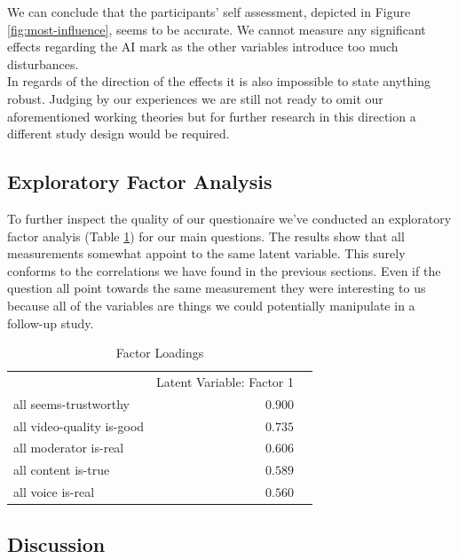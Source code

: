 \documentclass[
  a4paper,  %
  twoside,  %
  bibliography=totoc,
  headsepline,
  cleardoublepage=empty,
  parskip=half,
  draft=false
]{scrbook}
\begin{document}
 We can conclude that the participants' self assessment, depicted in Figure \ref{fig:most-influence}, seems to be accurate. We cannot measure any significant effects regarding the AI mark as the other variables introduce too much disturbances. \\
 In regards of the direction of the effects it is also impossible to state anything robust. Judging by our experiences we are still not ready to omit our aforementioned working theories but for further research in this direction a different study design would be required.

 \subsection{Exploratory Factor Analysis}
\label{subsec:factor-analysis}
 To further inspect the quality of our questionaire we've conducted an exploratory factor analyis (Table \ref{tab:factorLoadings}) for our main questions. The results show that all measurements somewhat appoint to the same latent variable. This surely conforms to the correlations we have found in the previous sections. Even if the question all point towards the same measurement they were interesting to us because all of the variables are things we could potentially manipulate in a follow-up study. 

\begin{table}[h]
	\centering
	\caption{Factor Loadings}
	\label{tab:factorLoadings}
	{
		\begin{tabular}{lrr}
			\toprule
			 & Latent Variable: Factor 1  \\
			\cmidrule[0.4pt]{1-3}
			all seems-trustworthy & $0.900$  \\
			all video-quality is-good & $0.735$  \\
			all moderator is-real & $0.606$  \\
			all content is-true & $0.589$  \\
			all voice is-real & $0.560$  \\
			\bottomrule
		\end{tabular}
	}
\end{table}

\subsection{Discussion}
\end{document}
